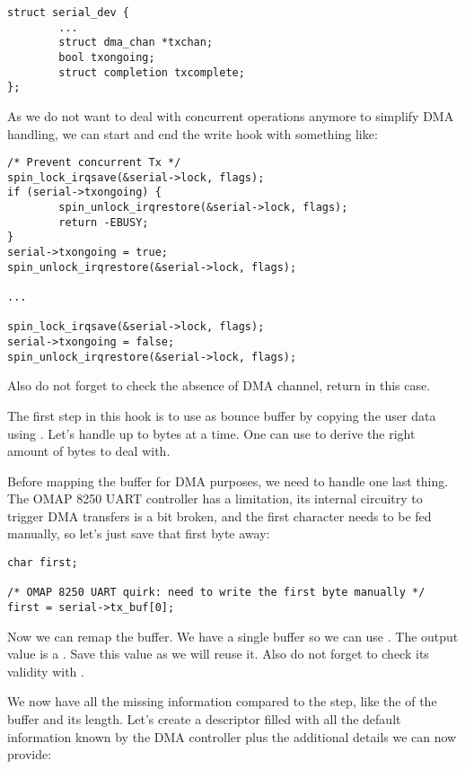 \begin{verbatim}
struct serial_dev {
        ...
        struct dma_chan *txchan;
        bool txongoing;
        struct completion txcomplete;
};
\end{verbatim}

As we do not want to deal with concurrent operations anymore to simplify DMA
handling, we can start and end the write hook with something like:

\begin{verbatim}
/* Prevent concurrent Tx */
spin_lock_irqsave(&serial->lock, flags);
if (serial->txongoing) {
        spin_unlock_irqrestore(&serial->lock, flags);
        return -EBUSY;
}
serial->txongoing = true;
spin_unlock_irqrestore(&serial->lock, flags);

...

spin_lock_irqsave(&serial->lock, flags);
serial->txongoing = false;
spin_unlock_irqrestore(&serial->lock, flags);
\end{verbatim}

Also do not forget to check the absence of DMA channel, return
 in this case.

The first step in this  hook is to use  as
bounce buffer by copying the user data using . Let's
handle up to  bytes at a time. One can use 
to derive the right amount of bytes to deal with.

Before mapping the buffer for DMA purposes, we need to handle one last
thing. The OMAP 8250 UART controller has a limitation, its internal circuitry
to trigger DMA transfers is a bit broken, and the first character needs to be
fed manually, so let's just save that first byte away:

\begin{verbatim}
char first;

/* OMAP 8250 UART quirk: need to write the first byte manually */
first = serial->tx_buf[0];
\end{verbatim}

Now we can remap the buffer. We have a single buffer so we can use
. The output value is a . Save this
value as we will reuse it. Also do not forget to check its validity with
.

We now have all the missing information compared to the 
step, like the  of the buffer and its length. Let's create a
descriptor filled with all the default information known by the DMA controller
plus the additional details we can now provide:

